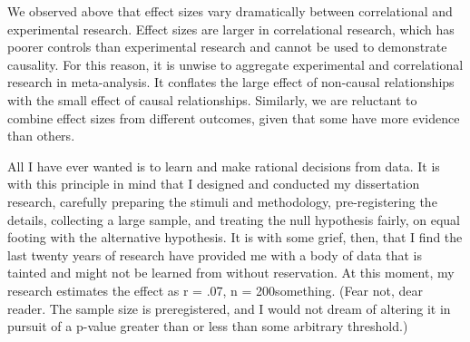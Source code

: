 \documentclass[man]{apa6}
\begin{document}
We observed above that effect sizes vary dramatically between correlational and experimental research. Effect sizes are larger in correlational research, which has poorer controls than experimental research and cannot be used to demonstrate causality. For this reason, it is unwise to aggregate experimental and correlational research in meta-analysis. It conflates the large effect of non-causal relationships with the small effect of causal relationships. Similarly, we are reluctant to combine effect sizes from different outcomes, given that some have more evidence than others. %

All I have ever wanted is to learn and make rational decisions from data. It is with this principle in mind that I designed and conducted my dissertation research, carefully preparing the stimuli and methodology, pre-registering the details, collecting a large sample, and treating the null hypothesis fairly, on equal footing with the alternative hypothesis. It is with some grief, then, that I find the last twenty years of research have provided me with a body of data that is tainted and might not be learned from without reservation. At this moment, my research estimates the effect as r = .07, n = 200something. (Fear not, dear reader. The sample size is preregistered, and I would not dream of altering it in pursuit of a p-value greater than or less than some arbitrary threshold.)


\end{document}
